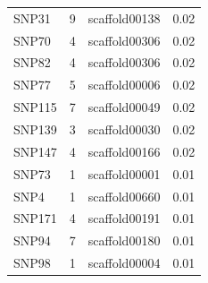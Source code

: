 \begin{longtable}{lrlr}
  SNP31 &   9 & scaffold00138 & 0.02 \\ 
  SNP70 &   4 & scaffold00306 & 0.02 \\ 
  SNP82 &   4 & scaffold00306 & 0.02 \\ 
  SNP77 &   5 & scaffold00006 & 0.02 \\ 
  SNP115 &   7 & scaffold00049 & 0.02 \\ 
  SNP139 &   3 & scaffold00030 & 0.02 \\ 
  SNP147 &   4 & scaffold00166 & 0.02 \\ 
  SNP73 &   1 & scaffold00001 & 0.01 \\ 
  SNP4 &   1 & scaffold00660 & 0.01 \\ 
  SNP171 &   4 & scaffold00191 & 0.01 \\ 
  SNP94 &   7 & scaffold00180 & 0.01 \\ 
  SNP98 &   1 & scaffold00004 & 0.01 \\ 
\hline
\end{longtable}



%
%



